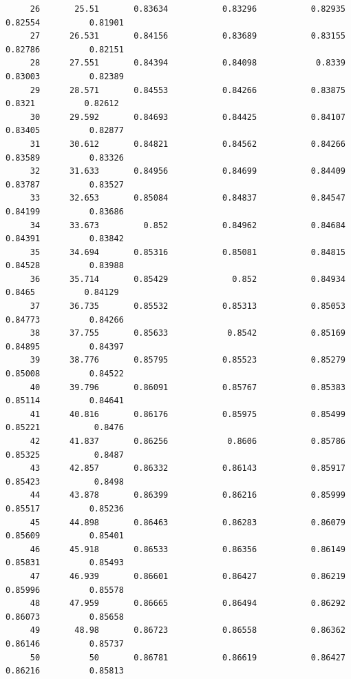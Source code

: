 \documentclass[
]{book}
\begin{document}
\begin{verbatim}
     26       25.51       0.83634           0.83296           0.82935           0.82554          0.81901   
     27      26.531       0.84156           0.83689           0.83155           0.82786          0.82151   
     28      27.551       0.84394           0.84098            0.8339           0.83003          0.82389   
     29      28.571       0.84553           0.84266           0.83875            0.8321          0.82612   
     30      29.592       0.84693           0.84425           0.84107           0.83405          0.82877   
     31      30.612       0.84821           0.84562           0.84266           0.83589          0.83326   
     32      31.633       0.84956           0.84699           0.84409           0.83787          0.83527   
     33      32.653       0.85084           0.84837           0.84547           0.84199          0.83686   
     34      33.673         0.852           0.84962           0.84684           0.84391          0.83842   
     35      34.694       0.85316           0.85081           0.84815           0.84528          0.83988   
     36      35.714       0.85429             0.852           0.84934            0.8465          0.84129   
     37      36.735       0.85532           0.85313           0.85053           0.84773          0.84266   
     38      37.755       0.85633            0.8542           0.85169           0.84895          0.84397   
     39      38.776       0.85795           0.85523           0.85279           0.85008          0.84522   
     40      39.796       0.86091           0.85767           0.85383           0.85114          0.84641   
     41      40.816       0.86176           0.85975           0.85499           0.85221           0.8476   
     42      41.837       0.86256            0.8606           0.85786           0.85325           0.8487   
     43      42.857       0.86332           0.86143           0.85917           0.85423           0.8498   
     44      43.878       0.86399           0.86216           0.85999           0.85517          0.85236   
     45      44.898       0.86463           0.86283           0.86079           0.85609          0.85401   
     46      45.918       0.86533           0.86356           0.86149           0.85831          0.85493   
     47      46.939       0.86601           0.86427           0.86219           0.85996          0.85578   
     48      47.959       0.86665           0.86494           0.86292           0.86073          0.85658   
     49       48.98       0.86723           0.86558           0.86362           0.86146          0.85737   
     50          50       0.86781           0.86619           0.86427           0.86216          0.85813   
\end{verbatim}
\end{document}
